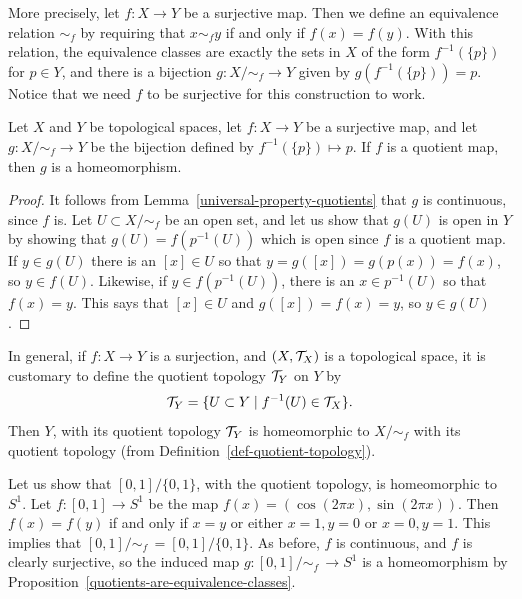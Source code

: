 More precisely, let $f :X \to Y$ be a surjective map. Then we define an equivalence relation $\sim_f$ by requiring that $x \sim_f y$ if and only if $f(x) = f(y)$. With this relation, the equivalence classes are exactly the sets in $X$ of the form $f^{-1}(\{p\})$ for $p \in Y$, and there is a bijection $g: X/\!\sim_f \to Y$ given by $g(f^{-1}(\{p\})) = p$. Notice that we need $f$ to be surjective for this construction to work.
\begin{prop}
  \label{quotients-are-equivalence-classes}
  Let $X$ and $Y$ be topological spaces, let $f : X \to Y$ be a surjective map, and let $g : X/ \!\sim_f \to Y$ be the bijection defined by $f^{-1}(\{p\}) \mapsto p$. If $f$ is a quotient map, then $g$ is a homeomorphism.
\end{prop}
\begin{proof}
  It follows from Lemma~\ref{universal-property-quotients} that $g$ is continuous, since $f$ is. Let $U \subset X/\!\sim_f$ be an open set, and let us show that $g(U)$ is open in $Y$ by showing that $g(U) = f(p^{-1}(U))$ which is open since $f$ is a quotient map. If $y \in g(U)$ there is an $[x] \in U$ so that $y = g([x]) = g(p(x)) = f(x)$, so $y \in f(U)$. Likewise, if $y \in f(p^{-1}(U))$, there is an $x \in p^{-1}(U)$ so that $f(x) = y$. This says that $[x] \in U$ and $g([x]) = f(x) = y$, so $y \in g(U)$.
\end{proof}
\begin{rem}
  In general, if $f : X \to Y$ is a surjection, and $(X,\mathcal{T}_X)$ is a topological space, it is customary to define the quotient topology $\mathcal{T}_Y$ on $Y$ by
  \[
    \mathcal{T}_Y = \{ U \subset Y \mid f^{-1}(U) \in \mathcal{T}_X \}.
  \]
  Then $Y$, with its quotient topology $\mathcal{T}_Y$ is homeomorphic to $X/\!\sim_f$ with its quotient topology (from Definition~\ref{def-quotient-topology}).
\end{rem}
\begin{example}
  \label{circle-from-interval}
  Let us show that $[0,1]/\{0,1\}$, with the quotient topology, is homeomorphic to $S^1$. Let $f : [0,1] \to S^1$ be the map $f(x) = (\cos(2\pi x), \sin(2\pi x))$. Then $f(x) = f(y)$ if and only if $x = y$ or either $x=1,y=0$ or $x=0,y=1$. This implies that $[0,1]/\!\sim_f\, = [0,1]/\{0,1\}$. As before, $f$ is continuous, and $f$ is clearly surjective, so the induced map $g : [0,1]/\!\sim_f \,\to S^1$ is a homeomorphism by Proposition~\ref{quotients-are-equivalence-classes}.
\end{example}
